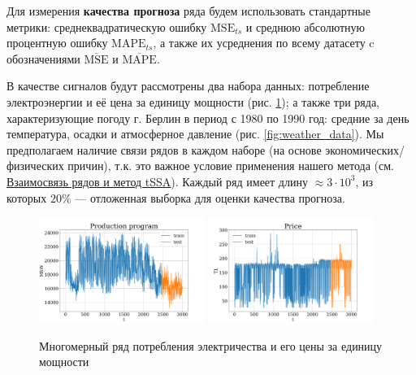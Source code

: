 			Для измерения \textbf{качества прогноза} ряда будем использовать стандартные метрики: среднеквадратическую ошибку $ \text{MSE}_{ts} $ и среднюю абсолютную процентную ошибку $ \text{MAPE}_{ts} $, а также их усреднения по всему датасету c обозначениями $ \overline{\text{MSE}} $ и $ \overline{\text{MAPE}} $.
			
			В качестве сигналов будут рассмотрены два набора данных: потребление электроэнергии и её цена за единицу мощности (рис. \ref{fig:electr_data}); а также три ряда, характеризующие погоду г. Берлин в период с 1980 по 1990 год: средние за день температура, осадки и атмосферное давление (рис. \ref{fig:weather_data}). Мы предполагаем наличие связи рядов в каждом наборе (на основе экономических/физических причин), т.к. это важное условие применения нашего метода (см. \hyperref[sec:tssa_method]{Взаимосвязь рядов и метод tSSA}). Каждый ряд имеет длину $ \approx 3 \cdot 10^3 $, из которых $ 20\% $ --- отложенная выборка для оценки качества прогноза.
			
			\begin{figure}[h]
				\centering
				\includegraphics[width=0.48\textwidth, keepaspectratio]{../figs/Electricity_Production}
				\includegraphics[width=0.48\textwidth, keepaspectratio]{../figs/Electricity_Price}
				\caption{Многомерный ряд потребления электричества и его цены за единицу мощности}\label{fig:electr_data}
			\end{figure}
			
